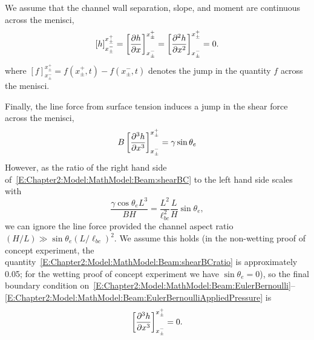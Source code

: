 We assume that the channel wall separation, slope, and moment are continuous across the menisci,
\begin{equation}\label{E:Chapter2:Model:MathModel:Beam:ContinuityBC}
\left[h\right]_{x_{\pm}^-}^{x_{\pm}^+} = \left[\frac{\partial h}{\partial x}\right]_{x_{\pm}^-}^{x_{\pm}^+} = \left[\frac{\partial ^2 h}{\partial x^2}\right]_{x_{\pm}^-}^{x_{\pm}^+} = 0.
\end{equation}
where $\left[f\right]_{x_{\pm}^-}^{x_{\pm}^+} = f(x_{\pm}^+,t) -  f(x_{\pm}^-,t)$ denotes the jump in the quantity $f$ across the menisci.

Finally, the line force from surface tension induces a jump in the shear force across the menisci,
\begin{equation}\label{E:Chapter2:Model:MathModel:Beam:shearBC}
B \left[\frac{\partial ^3 h}{\partial x^3 }\right]_{x_{\pm}^-}^{x_{\pm}^+}  = \gamma \sin \theta_e
\end{equation}
However, as the ratio of the right hand side of~\eqref{E:Chapter2:Model:MathModel:Beam:shearBC} to the left hand side scales with
\begin{equation}\label{E:Chapter2:Model:MathModel:Beam:shearBCratio}
\frac{\gamma \cos \theta_e L^3 }{B H} = \frac{L^2}{\ell_{bc}^2}\frac{L}{H} \sin \theta_e,
\end{equation}
we can ignore the line force provided the channel aspect ratio $(H/L) \gg\sin  \theta_e (L/\ell_{bc})^2 $. We assume this holds (in the non-wetting proof of concept experiment, the quantity~\eqref{E:Chapter2:Model:MathModel:Beam:shearBCratio} is approximately 0.05; for the wetting proof of concept experiment we have $\sin \theta_e = 0$), so the final boundary condition on~\eqref{E:Chapter2:Model:MathModel:Beam:EulerBernoulli}--\eqref{E:Chapter2:Model:MathModel:Beam:EulerBernoulliAppliedPressure} is
\begin{equation}\label{E:Chapter2:Model:MathModel:Beam:shearBCfinal}
 \left[\frac{\partial ^3 h}{\partial x^3 }\right]_{x_{\pm}^-}^{x_{\pm}^+}   = 0.
\end{equation}

